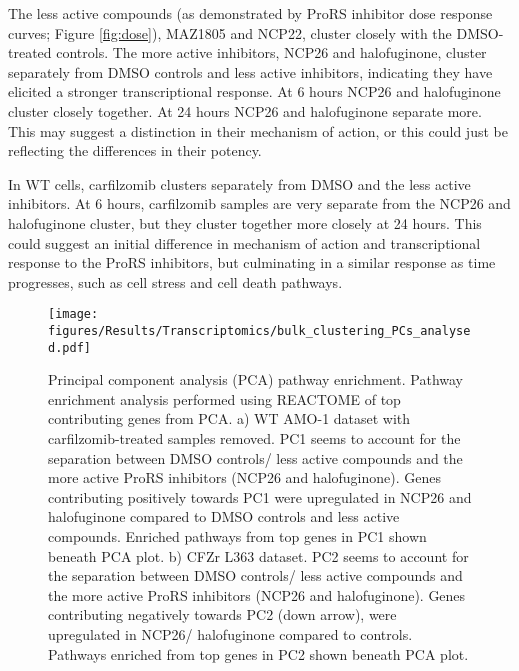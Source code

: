 The less active compounds (as demonstrated by ProRS inhibitor dose response curves; Figure \ref{fig:dose}), MAZ1805 and NCP22, cluster closely with the DMSO-treated controls.
The more active inhibitors, NCP26 and halofuginone, cluster separately from DMSO controls and less active inhibitors, indicating they have elicited a stronger transcriptional response.
At 6 hours NCP26 and halofuginone cluster closely together.
At 24 hours NCP26 and halofuginone separate more.
This may suggest a distinction in their mechanism of action, or this could just be reflecting the differences in their potency.

In WT cells, carfilzomib clusters separately from DMSO and the less active inhibitors.
At 6 hours, carfilzomib samples are very separate from the NCP26 and halofuginone cluster, but they cluster together more closely at 24 hours.
This could suggest an initial difference in mechanism of action and transcriptional response to the ProRS inhibitors, but culminating in a similar response as time progresses, such as cell stress and cell death pathways.

\begin{figure}[htb]
\centering
\texttt{[image: figures/Results/Transcriptomics/bulk\_clustering\_PCs\_analysed.pdf]}
\caption[PCA pathway enrichment]{Principal component analysis (PCA) pathway enrichment.
Pathway enrichment analysis performed using REACTOME of top contributing genes from PCA.
a) WT AMO-1 dataset with carfilzomib-treated samples removed.
PC1 seems to account for the separation between DMSO controls/ less active compounds and the more active ProRS inhibitors (NCP26 and halofuginone).
Genes contributing positively towards PC1 were upregulated in NCP26 and halofuginone compared to DMSO controls and less active compounds.
Enriched pathways from top genes in PC1 shown beneath PCA plot.
b) CFZr L363 dataset.
PC2 seems to account for the separation between DMSO controls/ less active compounds and the more active ProRS inhibitors (NCP26 and halofuginone).
Genes contributing negatively towards PC2 (down arrow), were upregulated in NCP26/ halofuginone compared to controls.
Pathways enriched from top genes in PC2 shown beneath PCA plot.}
\label{fig:pca_pathway}
\end{figure}

